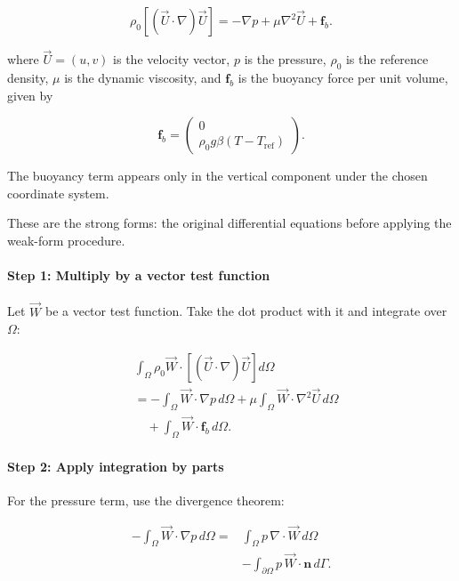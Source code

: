 \documentclass[preprint,3p,number]{elsarticle}
\begin{document}
\begin{equation}
\rho_0\left[
(\vec{U}\cdot\nabla)\vec{U}
\right]
=-\nabla p+\mu\nabla^2\vec{U}+\mathbf{f}_b.
\end{equation}

where $\vec{U}=(u,v)$ is the velocity vector,
$p$ is the pressure, $\rho_0$ is the reference density,
$\mu$ is the dynamic viscosity, and $\mathbf{f}_b$
is the buoyancy force per unit volume, given by

\begin{equation}
\mathbf{f}_b=
\begin{pmatrix}
0\\
\rho_0g\beta(T-T_{\mathrm{ref}})
\end{pmatrix}.
\end{equation}

The buoyancy term appears only in the vertical component
under the chosen coordinate system.

These are the strong forms: the original differential
equations before applying the weak-form procedure.

\paragraph{Step 1: Multiply by a vector test function}

Let $\vec{W}$ be a vector test function.
Take the dot product with it and integrate over $\Omega$:

\begin{equation}
\begin{aligned}
&\int_\Omega \rho_0\vec{W}\cdot
\left[
(\vec{U}\cdot\nabla)\vec{U}
\right]d\Omega\\
&=-\int_\Omega\vec{W}\cdot\nabla p\,d\Omega
+\mu\int_\Omega\vec{W}\cdot
\nabla^2\vec{U}\,d\Omega\\
&\quad+\int_\Omega\vec{W}\cdot
\mathbf{f}_b\,d\Omega.
\end{aligned}
\end{equation}

\paragraph{Step 2: Apply integration by parts}

For the pressure term, use the divergence theorem:

\begin{equation}
\begin{aligned}
-\int_\Omega\vec{W}\cdot\nabla p\,d\Omega
={}&\int_\Omega p\,\nabla\cdot\vec{W}\,d\Omega\\
&-\int_{\partial\Omega}p\,
\vec{W}\cdot\mathbf{n}\,d\Gamma.
\end{aligned}
\end{equation}
\end{document}
